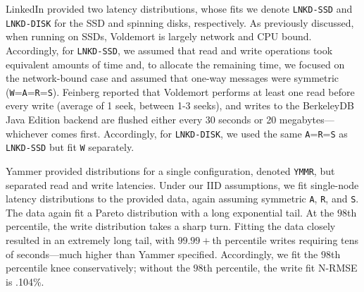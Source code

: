 \documentclass{vldb}
\begin{document}
LinkedIn provided two latency distributions, whose fits we denote
\texttt{LNKD-SSD} and \texttt{LNKD-DISK} for the SSD and spinning
disks, respectively.  As previously discussed, when running on SSDs,
Voldemort is largely network and CPU bound.  Accordingly, for
\texttt{LNKD-SSD}, we assumed that read and write operations took
equivalent amounts of time and, to allocate the remaining time, we
focused on the network-bound case and assumed that one-way messages
were symmetric (\texttt{W}=\texttt{A}=\texttt{R}=\texttt{S}). Feinberg
reported that Voldemort performs at least one read before every write
(average of 1 seek, between 1-3 seeks), and writes to the BerkeleyDB
Java Edition backend are flushed either every 30 seconds or 20
megabytes---whichever comes first.  Accordingly, for
\texttt{LNKD-DISK}, we used the same \texttt{A}=\texttt{R}=\texttt{S}
as \texttt{LNKD-SSD} but fit \texttt{W} separately.

Yammer provided distributions for a single configuration, denoted
\texttt{YMMR}, but separated read and write latencies.  Under our IID
assumptions, we fit single-node latency distributions to the provided
data, again assuming symmetric \texttt{A}, \texttt{R}, and \texttt{S}.
The data again fit a Pareto distribution with a long exponential tail.
At the $98$th percentile, the write distribution takes a sharp turn.
Fitting the data closely resulted in an extremely long tail, with
$99.99+$th percentile writes requiring tens of seconds---much higher
than Yammer specified.  Accordingly, we fit the $98$th percentile knee
conservatively; without the $98$th percentile, the write fit N-RMSE is
.104\%.
\end{document}
